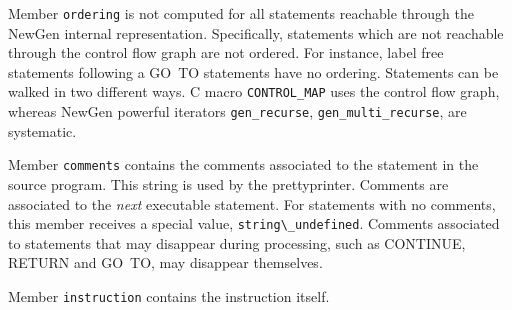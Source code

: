 {Member {\tt ordering} is not computed for all statements reachable
through the NewGen internal representation. Specifically, statements
which are not reachable through the control flow graph are not
ordered. For instance, label free statements following a GO~TO
statements have no ordering. Statements can be walked in two different
ways. C macro \verb/CONTROL_MAP/ uses the control
flow graph, whereas NewGen powerful iterators
\verb/gen_recurse/,
\verb/gen_multi_recurse/, are systematic.

\iffalse
Notons que le champs \verb/ordering/ n'est pas force'ment calcule' pour
tous les statements. En particulier, les statements qui ne sont pas
accessibles d'apre`s le flot de contro^le n'en ont pas. Les statements
sans e'tiquette se trouvant derrie`re un GOTO en sont un exemple. Les
statements peuvent e^tre parcourus de manie`re se'lective, suivant le
flot de contro^le, avec la macro \verb/CONTROL_MAP/\index{CONTROL MAP},
ou de manie`re syste'matique avec les fonctions de parcours de NewGen,
\verb/gen_recurse/\index{gen\_recurse},
\verb/gen_multi_recurse/\index{gen\_multi\_recurse},...
\fi

Member {\tt comments} contains the comments associated to the statement
in the source program. This string is used by the
prettyprinter. Comments are associated to the {\em next} executable
statement. For statements with no comments, this member receives a
special value, \verb/string\_undefined/. Comments associated to
statements that may disappear during processing, such as CONTINUE,
RETURN and GO~TO, may disappear themselves.

\iffalse
Le sous-domaine {\tt comments} contient le texte du commentaire associe'
a ce statement dans le programme initial; ce texte est utilise' par le
prettyprinter. Ce sont les commentaires qui pre'ce`dent le statement
qui s'y trouvent associe's. En l'absence de commentaires, ce champ
prend la valeur \verb/string\_undefined/. Les commentaires associe's a`
des instructions qui peuvent disparai^tre au cours des traitements comme
CONTINUE, RETURN et GOTO, peuvent aussi disparaitre.
\fi

Member {\tt instruction} contains the instruction itself.

\iffalse
Le sous-domaine \verb/instruction/ contient
l'instruction proprement dite.
\fi

{}

}
